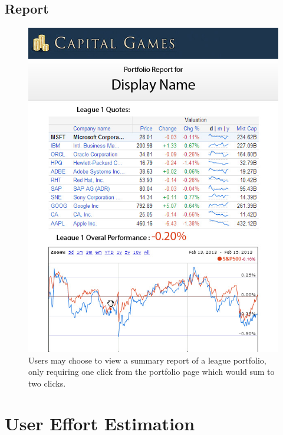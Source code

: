 \subsection{Report}
{
\begin{figure}
\centering
\includegraphics[width=5.5in]{./mockups/JPEG/Report.jpg}
\caption{Users may choose to view a summary report of a league portfolio, only requiring one click from the portfolio page which would sum to two clicks.}
\end{figure}
}

\section{User Effort Estimation}